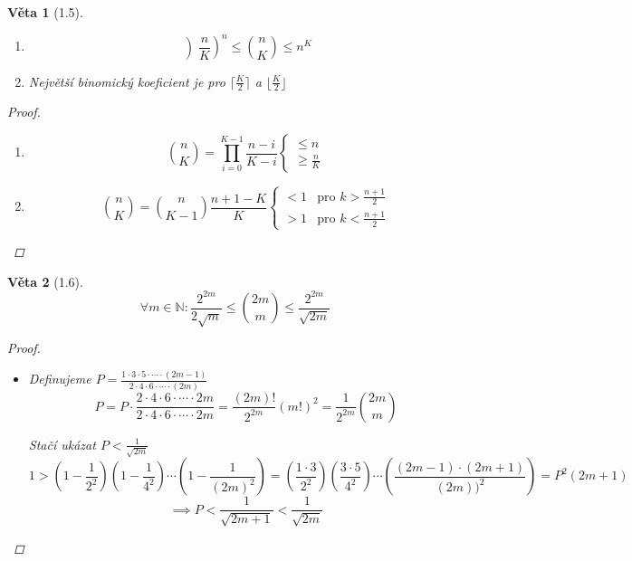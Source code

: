 \documentclass[10pt,a4paper]{article}
\theoremstyle{plain}
\newtheorem*{veta}{Věta}
\begin{document}
\begin{veta}[1.5] \begin{enumerate}[]
		\item \[ \left) \frac{n}{K} \right)^n \leq \binom{n}{K} \leq n^K \]
		\item Největší binomický koeficient je pro $\lceil  \frac{K}2 \rceil$ a $\lfloor  \frac{K}2 \rfloor$
\end{enumerate}	
\begin{proof}
	\begin{enumerate}
		\item \[ \binom{n}{K} = \prod_{i=0}^{K-1} \frac{n-i}{K-i} \begin{cases}
		\leq n \\
		\geq \frac{n}{K}		
		\end{cases} \]

	\item  \[ \binom{n}{K} = \binom{n}{K-1} \frac{n+1-K}{K} \begin{cases}
		< 1 & \text{pro } k > \frac{n+1}2\\
		> 1  & \text{pro } k < \frac{n+1}2
		\end{cases} \]
\end{enumerate}
\end{proof}
\end{veta}

\begin{veta}[1.6]
	\[\forall m \in \mathbb{N}: \frac{2^{2m}}{2\sqrt{m}} \leq \binom{2m}{m} \leq  \frac{2^{2m}}{\sqrt{2m}}\]
	\begin{proof}
		\begin{itemize}
			\item Definujeme $P = \frac{1 \cdot 3 \cdot 5 \cdot \cdots \cdot (2m-1)}{2 \cdot 4 \cdot 6 \cdot \cdots \cdot (2m)} $
			\[ P = P \cdot \frac{2 \cdot 4 \cdot 6 \cdot \cdots \cdot 2m}{2 \cdot 4 \cdot 6 \cdot \cdots \cdot 2m} = \frac{(2m)!}{2^{2m}}(m!)^2 = \frac{1}{2^{2m}} \binom{2m}{m} \]

			Stačí ukázat $P < \frac{1}{\sqrt{2m}}$
			\[ 1 > \left( 1- \frac{1}{2^2} \right)\left( 1- \frac{1}{4^2} \right)\cdots \left( 1- \frac{1}{(2m)^2} \right)
			= \left( \frac{1 \cdot 3}{2^2} \right)\left( \frac{3 \cdot 5}{4^2} \right)\cdots \left( \frac{(2m-1) \cdot (2m+1)}{(2m))^2} \right)
			= P^2 (2m+1) \] \[
				\implies P < \frac{1}{\sqrt{2m+1}} < \frac{1}{\sqrt{2m}}
				\]
		\end{itemize}
	\end{proof}
\end{veta}
\end{document}
